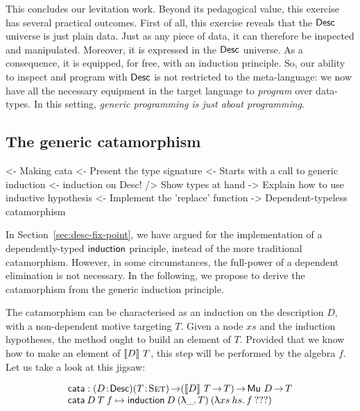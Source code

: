 
This concludes our levitation work. Beyond its pedagogical value, this
exercise has several practical outcomes. First of all, this exercise
reveals that the $\Desc$ universe is just plain data. Just as any
piece of data, it can therefore be inspected and
manipulated. Moreover, it is expressed in the $\Desc$ universe. As a
consequence, it is equipped, for free, with an induction
principle. So, our ability to inspect and program with $\Desc$ is not
restricted to the meta-language: we now have all the necessary
equipment in the target language to \emph{program} over data-types. In
this setting, \emph{generic programming is just about programming}.


\subsection{The generic catamorphism}

\begin{wstructure}
<- Making cata
    <- Present the type signature
    <- Starts with a call to generic induction
        <- induction on Desc!
        /> Show types at hand
        -> Explain how to use inductive hypothesis
    <- Implement the 'replace' function
    -> Dependent-typeless catamorphism 
\end{wstructure}

In Section~\ref{sec:desc-fix-point}, we have argued for the
implementation of a dependently-typed $\F{induction}$ principle,
instead of the more traditional catamorphism. However, in some
circumstances, the full-power of a dependent elimination is not
necessary. In the following, we propose to derive the catamorphism
from the generic induction principle. 

The catamorphism can be characterised as an induction on the
description $D$, with a non-dependent motive targeting $T$. Given a
node $xs$ and the induction hypotheses, the method ought to build an
element of $T$. Provided that we know how to make an element of
$\descop{D}{T}$, this step will be performed by the algebra $f$. Let
us take a look at this jigsaw:

\newcommand{\cata}{\F{cata}}

\[\stk{
\cata : \PITEL{D}{\Desc}
           \PI{T}{\Set}
           (\descop{D}{T} \To T) \To 
           \Mu{D} \To T \\
\cata\: D\: T\: f \mapsto
  \F{induction}\: D\: (\LAM{\_}T)\: (\LAM{xs\:hs} f\: ???)
}\]

